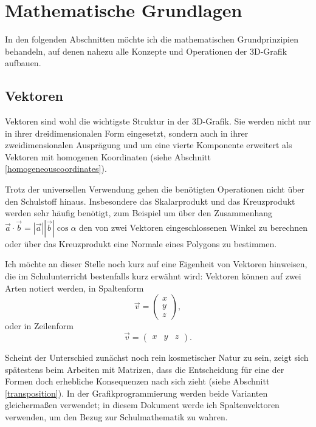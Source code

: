 \chapter{Mathematische Grundlagen}
\label{mathgrundlagen}
In den folgenden Abschnitten möchte ich die mathematischen Grundprinzipien behandeln, auf denen nahezu alle Konzepte und Operationen der 3D-Grafik aufbauen.

\section{Vektoren}
Vektoren sind wohl die wichtigste Struktur in der 3D-Grafik. Sie werden nicht nur in ihrer dreidimensionalen Form eingesetzt, sondern auch in ihrer zweidimensionalen Ausprägung und um eine vierte Komponente erweitert als Vektoren mit homogenen Koordinaten (siehe Abschnitt \ref{homogeneouscoordinates}).

Trotz der universellen Verwendung gehen die benötigten Operationen nicht über den Schulstoff hinaus. Insbesondere das Skalarprodukt und das Kreuzprodukt werden sehr häufig benötigt, zum Beispiel um über den Zusammenhang
$\vec{a}\cdot\vec{b} = \left|\vec{a}\right|\left|\vec{b}\right|\cos\alpha$
den von zwei Vektoren eingeschlossenen Winkel zu berechnen oder über das Kreuzprodukt eine Normale eines Polygons zu bestimmen.

Ich möchte an dieser Stelle noch kurz auf eine Eigenheit von Vektoren hinweisen, die im Schulunterricht bestenfalls kurz erwähnt wird: Vektoren können auf zwei Arten notiert werden, in Spaltenform
\begin{equation*}
 \vec{v} = \begin{pmatrix} x \\ y \\ z \end{pmatrix},
\end{equation*}
oder in Zeilenform
\begin{equation*}
 \vec{v} = \begin{pmatrix} x & y & z \end{pmatrix}.
\end{equation*}

Scheint der Unterschied zunächst noch rein kosmetischer Natur zu sein, zeigt sich spätestens beim Arbeiten mit Matrizen, dass die Entscheidung für eine der Formen doch erhebliche Konsequenzen nach sich zieht (siehe Abschnitt \ref{transposition}). In der Grafikprogrammierung werden beide Varianten gleichermaßen verwendet; in diesem Dokument werde ich Spaltenvektoren verwenden, um den Bezug zur Schulmathematik zu wahren.

